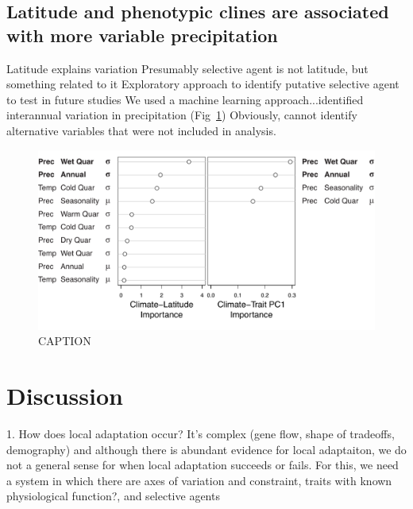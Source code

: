 \documentclass[11pt, oneside]{article}\usepackage[]{graphicx}\usepackage[]{color}
\begin{document}
\subsection*{Latitude and phenotypic clines are associated with more variable precipitation}

Latitude explains variation
Presumably selective agent is not latitude, but something related to it
Exploratory approach to identify putative selective agent to test in future studies
We used a machine learning approach...identified interannual variation in precipitation (Fig~\ref{fig:Fig_ClimVarImp})
Obviously, cannot identify alternative variables that were not included in analysis.


\begin{figure}[h!]
	\centerline{\includegraphics[width=1\textwidth]{Figures/Figure_ClimVarImp.pdf}}
	\fontsize{10}{12}
	\selectfont
	\caption[Interannual variation in precipitation is closely correlated with latitude and trait variation]{CAPTION}
	\label{fig:Fig_ClimVarImp}
\end{figure}


\section*{Discussion}

1. How does local adaptation occur? It's complex (gene flow, shape of tradeoffs, demography) and although there is abundant evidence for local adaptaiton, we do not a general sense for when local adaptation succeeds or fails. For this, we need a system in which there are axes of variation and constraint, traits with known physiological function?, and selective agents
\end{document}
